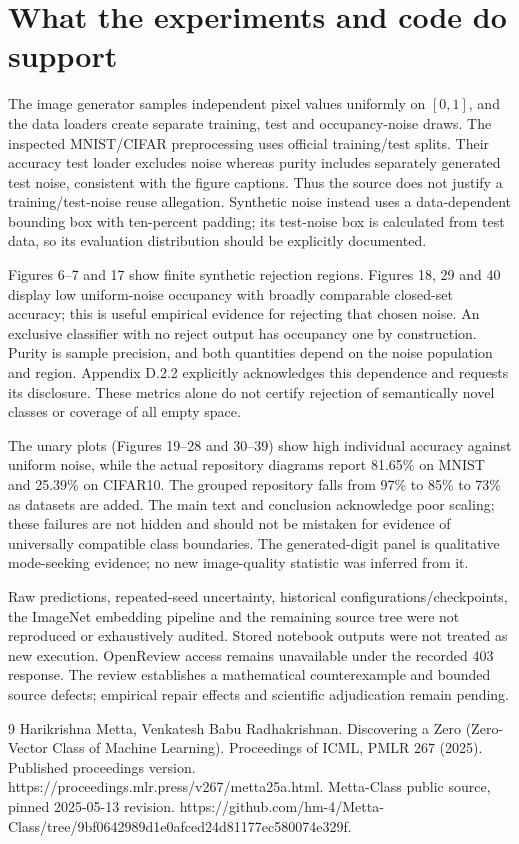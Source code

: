 \documentclass[10pt]{article}
\begin{document}
\section*{What the experiments and code do support}
The image generator samples independent pixel values uniformly on \([0,1]\), and the data loaders create separate training, test and occupancy-noise draws. The inspected MNIST/CIFAR preprocessing uses official training/test splits. Their accuracy test loader excludes noise whereas purity includes separately generated test noise, consistent with the figure captions. Thus the source does not justify a training/test-noise reuse allegation. Synthetic noise instead uses a data-dependent bounding box with ten-percent padding; its test-noise box is calculated from test data, so its evaluation distribution should be explicitly documented.\par
Figures 6–7 and 17 show finite synthetic rejection regions. Figures 18, 29 and 40 display low uniform-noise occupancy with broadly comparable closed-set accuracy; this is useful empirical evidence for rejecting that chosen noise. An exclusive classifier with no reject output has occupancy one by construction. Purity is sample precision, and both quantities depend on the noise population and region. Appendix D.2.2 explicitly acknowledges this dependence and requests its disclosure. These metrics alone do not certify rejection of semantically novel classes or coverage of all empty space.\par
The unary plots (Figures 19–28 and 30–39) show high individual accuracy against uniform noise, while the actual repository diagrams report 81.65\% on MNIST and 25.39\% on CIFAR10. The grouped repository falls from 97\% to 85\% to 73\% as datasets are added. The main text and conclusion acknowledge poor scaling; these failures are not hidden and should not be mistaken for evidence of universally compatible class boundaries. The generated-digit panel is qualitative mode-seeking evidence; no new image-quality statistic was inferred from it.\par
Raw predictions, repeated-seed uncertainty, historical configurations/checkpoints, the ImageNet embedding pipeline and the remaining source tree were not reproduced or exhaustively audited. Stored notebook outputs were not treated as new execution. OpenReview access remains unavailable under the recorded 403 response. The review establishes a mathematical counterexample and bounded source defects; empirical repair effects and scientific adjudication remain pending.\par
9 Harikrishna Metta, Venkatesh Babu Radhakrishnan. Discovering a Zero (Zero-Vector Class of Machine Learning). Proceedings of ICML, PMLR 267 (2025). Published proceedings version. https://proceedings.mlr.press/v267/metta25a.html. Metta-Class public source, pinned 2025-05-13 revision. https://github.com/hm-4/Metta-Class/tree/9bf0642989d1e0afced24d81177ec580074e329f.\par
\end{document}

